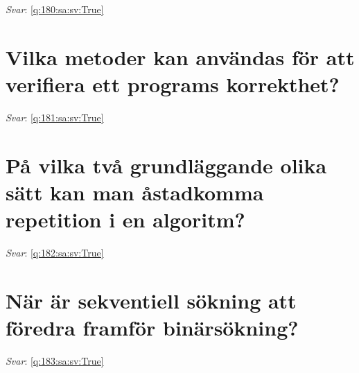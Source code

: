 \documentclass[a4paper,11pt,oneside]{book}
\begin{document}
\begin{sloppypar}
\vspace{2cm}

\noindent\makebox[\textwidth]{\hrulefill}

\vspace{1cm}

\textit{Svar}: \autoref{q:180:sa:sv:True}



\section{Vilka metoder kan anv\"andas f\"or att verifiera ett programs korrekthet?}

\label{q:181:sa:sv:False}

\vspace{2cm}

\noindent\makebox[\textwidth]{\hrulefill}

\vspace{1cm}

\textit{Svar}: \autoref{q:181:sa:sv:True}



\section{P\r{a} vilka tv\r{a} grundl\"aggande olika s\"att kan man \r{a}stadkomma repetition i en algoritm?}

\label{q:182:sa:sv:False}

\vspace{2cm}

\noindent\makebox[\textwidth]{\hrulefill}

\vspace{1cm}

\textit{Svar}: \autoref{q:182:sa:sv:True}



\section{N\"ar \"ar sekventiell s\"okning att f\"oredra framf\"or bin\"ars\"okning?}

\label{q:183:sa:sv:False}

\vspace{2cm}

\noindent\makebox[\textwidth]{\hrulefill}

\vspace{1cm}

\textit{Svar}: \autoref{q:183:sa:sv:True}




\end{sloppypar}
\end{document}
